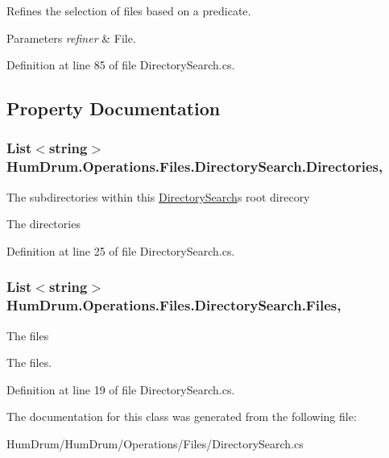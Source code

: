 Refines the selection of files based on a predicate. 


\begin{DoxyParams}{Parameters}
{\em refiner} & File.\\
\hline
\end{DoxyParams}


Definition at line 85 of file Directory\+Search.\+cs.



\subsection{Property Documentation}
\subsubsection[{\texorpdfstring{Directories}{Directories}}]{\setlength{\rightskip}{0pt plus 5cm}List$<$string$>$ Hum\+Drum.\+Operations.\+Files.\+Directory\+Search.\+Directories\hspace{0.3cm}{\ttfamily [get]}, {\ttfamily [set]}}\hypertarget{classHumDrum_1_1Operations_1_1Files_1_1DirectorySearch_a6795fc572ba723e404c68ebec38508f6}{}\label{classHumDrum_1_1Operations_1_1Files_1_1DirectorySearch_a6795fc572ba723e404c68ebec38508f6}


The subdirectories within this \hyperlink{classHumDrum_1_1Operations_1_1Files_1_1DirectorySearch}{Directory\+Search}\textquotesingle{}s root direcory 

The directories

Definition at line 25 of file Directory\+Search.\+cs.

\subsubsection[{\texorpdfstring{Files}{Files}}]{\setlength{\rightskip}{0pt plus 5cm}List$<$string$>$ Hum\+Drum.\+Operations.\+Files.\+Directory\+Search.\+Files\hspace{0.3cm}{\ttfamily [get]}, {\ttfamily [set]}}\hypertarget{classHumDrum_1_1Operations_1_1Files_1_1DirectorySearch_ae7bda27ea2f731ad9bbc04ae27d48fa9}{}\label{classHumDrum_1_1Operations_1_1Files_1_1DirectorySearch_ae7bda27ea2f731ad9bbc04ae27d48fa9}


The files 

The files.

Definition at line 19 of file Directory\+Search.\+cs.



The documentation for this class was generated from the following file\+:\begin{DoxyCompactItemize}
\item 
Hum\+Drum/\+Hum\+Drum/\+Operations/\+Files/Directory\+Search.\+cs\end{DoxyCompactItemize}
